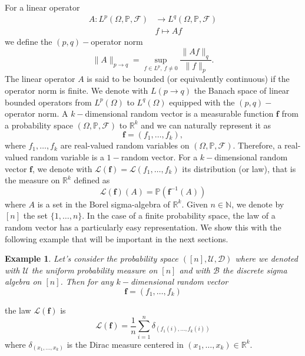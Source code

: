 \documentclass[11pt]{article}
\newtheorem{example}[theorem]{Example}
\def\R{\mathbb{R}}
\def\N{\mathbb{N}}
\def\P{\mathbb{P}}
\begin{document}
For a linear operator 
$$\begin{aligned}
    A:L^p(\Omega, \P,\mathcal{F})&\longrightarrow L^q(\Omega,\P,\mathcal{F})\\
& f\mapsto Af
\end{aligned}$$ we define the $(p,q)-$operator norm $$
\|A\|_{p\rightarrow q}=\sup_{f\in L^p,\ f\neq 0} \frac{\|Af\|_q}{\|f\|_p}.
$$
The linear operator $A$ is said to be bounded (or equivalently continuous) if the operator norm is finite. We denote with $L(p\rightarrow q)$ the Banach space of linear bounded operators from $L^p(\Omega)$ to $L^q(\Omega)$ equipped with the $(p,q)-$operator norm.\newline
A $k-$dimensional random vector is a measurable function $\mathbf{f}$ from a probability space $(\Omega,\P,\mathcal{F})$ to $\R^k$ and we can naturally represent it as $$
\mathbf{f}=(f_1,\ldots,f_k)
,$$ where $f_1,\ldots,f_k$ are real-valued random variables on $(\Omega,\P,\mathcal{F})$. Therefore, a real-valued random variable is a $1-$random vector. For a $k-$dimensional random vector $\mathbf{f}$, we denote with $\mathcal{L}(\mathbf{f})=\mathcal{L}(f_1,\ldots,f_k)$ its distribution (or law), that is the measure on $\R^k$ defined as  
$$
\mathcal{L}(\mathbf{f})(A)=\P(\mathbf{f}^{-1}(A))
$$
where $A$ is a set in the Borel sigma-algebra of $\R^k$. \newline
Given $n\in\N$,
we denote by $[n]$ the set $\{1,\ldots,n\}$. In the case of a finite probability space, the law of a random vector has a particularly easy representation. We show this with the following example that will be important in the next sections. 
\begin{example}
Let's consider the probability space $([n],\mathcal{U},\mathcal{D})$ where we denoted with $\mathcal{U}$ the uniform probability measure on $[n]$ and with $\mathcal{B}$ the discrete sigma algebra on $[n]$. Then for any $k-$dimensional random vector $$
\mathbf{f}=(f_1,\ldots,f_k)$$
\end{example}
the law $\mathcal{L}(\mathbf{f})$ is 
$$
\mathcal{L}(\mathbf{f})=\frac{1}{n}\sum^n_{i=1}\delta_{(f_1(i),\ldots,f_k(i))}
$$
where $\delta_{(x_1,\ldots,x_k)}$ is the Dirac measure centered in $(x_1,\ldots,x_k)\in \R^k$.
\end{document}
